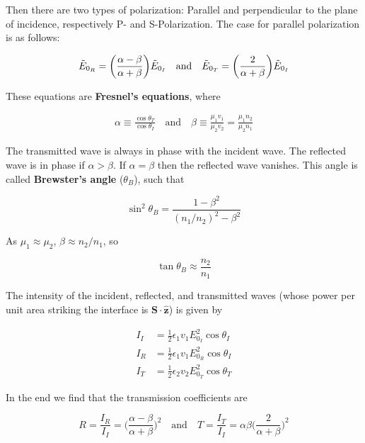 \documentclass[a4paper]{article}
\begin{document}
Then there are two types of polarization: Parallel and perpendicular to the plane of incidence, respectively P- and S-Polarization. The case for parallel polarization is as follows:


\begin{align*}
    \Tilde{E}_{0_{R}}=\bigg(\frac{\alpha-\beta}{\alpha+\beta}\bigg)\Tilde{E}_{0_{I}}\quad\text{and}\quad\Tilde{E}_{0_{T}}=\bigg(\frac{2}{\alpha+\beta}\bigg)\Tilde{E}_{0_{I}}
\end{align*}

These equations are \textbf{Fresnel's equations}, where

\begin{align*}
    \alpha\equiv\frac{\cos\theta_T}{\cos\theta_I}\quad\text{and}\quad\beta\equiv\frac{\mu_1v_1}{\mu_2v_2}=\frac{\mu_1n_2}{\mu_2n_1}
\end{align*}

The transmitted wave is always in phase with the incident wave. The reflected wave is in phase if $\alpha>\beta$. If $\alpha=\beta$ then the reflected wave vanishes. This angle is called \textbf{Brewster's angle} ($\theta_B$), such that

\begin{equation*}
    \sin^2\theta_B=\frac{1-\beta^2}{(n_1/n_2)^2-\beta^2}
\end{equation*}

As $\mu_1\approx\mu_2$, $\beta\approx n_2/n_1$, so

\begin{equation*}
    \tan\theta_B\approx \frac{n_2}{n_1}
\end{equation*}

The intensity of the incident, reflected, and transmitted waves (whose power per unit area striking the interface is $\bm{S}\cdot\bm{\hat{z}}$) is given by

\begin{align*}
    I_I&=\frac{1}{2}\epsilon_1v_1E_{0_{I}}^2\cos\theta_I\\[1em]
    I_R&=\frac{1}{2}\epsilon_1v_1E_{0_{R}}^2\cos\theta_I\\[1em]
    I_T&=\frac{1}{2}\epsilon_2v_2E_{0_{T}}^2\cos\theta_T
\end{align*}

In the end we find that the transmission coefficients are 

\begin{equation*}
    R=\frac{I_R}{I_I}=\bigg(\frac{\alpha-\beta}{\alpha+\beta}\bigg)^2\quad\text{and}\quad T=\frac{I_T}{I_I}=\alpha\beta\bigg(\frac{2}{\alpha+\beta}\bigg)^2
\end{equation*}
\end{document}
